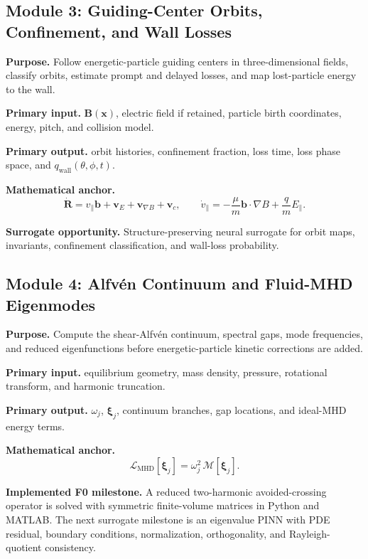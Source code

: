 \documentclass[11pt]{article}
\begin{document}
\subsection{Module 3: Guiding-Center Orbits, Confinement, and Wall Losses}
\textbf{Purpose.} Follow energetic-particle guiding centers in three-dimensional fields, classify orbits, estimate prompt and delayed losses, and map lost-particle energy to the wall.

\textbf{Primary input.} $\mathbf B(\mathbf x)$, electric field if retained, particle birth coordinates, energy, pitch, and collision model.

\textbf{Primary output.} orbit histories, confinement fraction, loss time, loss phase space, and $q_{\mathrm{wall}}(\theta,\phi,t)$.

\textbf{Mathematical anchor.}
\begin{equation}
\dot{\mathbf R}=v_{\parallel}\mathbf b+\mathbf v_E+\mathbf v_{\nabla B}+\mathbf v_c,\qquad \dot v_{\parallel}=-\frac{\mu}{m}\mathbf b\cdot\nabla B+\frac{q}{m}E_{\parallel}.
\end{equation}

\textbf{Surrogate opportunity.} Structure-preserving neural surrogate for orbit maps, invariants, confinement classification, and wall-loss probability.


\subsection{Module 4: Alfvén Continuum and Fluid-MHD Eigenmodes}
\textbf{Purpose.} Compute the shear-Alfvén continuum, spectral gaps, mode frequencies, and reduced eigenfunctions before energetic-particle kinetic corrections are added.

\textbf{Primary input.} equilibrium geometry, mass density, pressure, rotational transform, and harmonic truncation.

\textbf{Primary output.} $\omega_j$, $\boldsymbol\xi_j$, continuum branches, gap locations, and ideal-MHD energy terms.

\textbf{Mathematical anchor.}
\begin{equation}
\mathcal L_{\mathrm{MHD}}[\boldsymbol\xi_j]=\omega_j^2\,\mathcal M[\boldsymbol\xi_j].
\end{equation}

\textbf{Implemented F0 milestone.} A reduced two-harmonic avoided-crossing operator is solved with symmetric finite-volume matrices in Python and MATLAB. The next surrogate milestone is an eigenvalue PINN with PDE residual, boundary conditions, normalization, orthogonality, and Rayleigh-quotient consistency.
\end{document}
